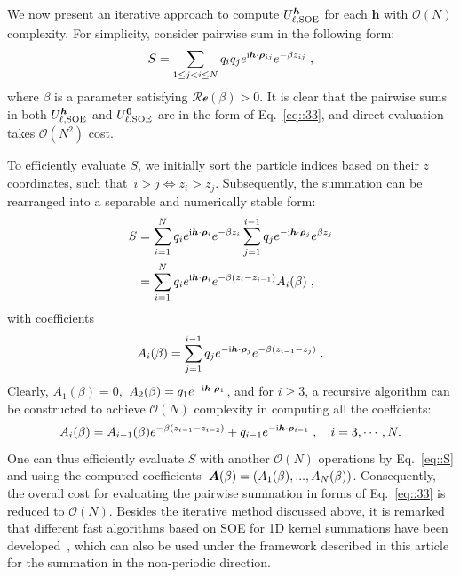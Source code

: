 We now present an iterative approach to compute $U_{\ell,\text{SOE}}^{\boldsymbol{h}}$ for each $\bm{h}$ with $\mathcal O(N)$ complexity. 
For simplicity, consider pairwise sum in the following form:
\begin{equation}\label{eq::33}
	S = \sum_{1\leq j < i \leq N} q_{i} q_{j} e^{\mathrm{i} \boldsymbol{h} \cdot \boldsymbol{\rho}_{ij}} e^{ - \beta z_{ij} }\;,
\end{equation}
where $\beta$ is a parameter satisfying $\mathscr{Re}(\beta)>0$. It is clear that the pairwise sums in both $U_{\ell,\text{SOE}}^{\boldsymbol{h}}$ and $U_{\ell,\text{SOE}}^{\boldsymbol{0}}$ are in the form of Eq.~\eqref{eq::33}, and direct evaluation takes $\mathcal O(N^2)$ cost. 

To efficiently evaluate $S$, we initially sort the particle indices based on their $z$ coordinates, such that~$i > j \iff z_i > z_j$.
Subsequently, the summation can be rearranged into a separable and numerically stable form:
\begin{align}
	S &=\sum_{i = 1}^N q_{i} e^{\mathrm{i} \bm{h}\cdot\bm{\rho}_{i}}e^{-\beta z_{i}} \sum_{j = 1}^{i - 1} q_{j} e^{-\mathrm{i} \bm{h}\cdot\bm{\rho}_{j}}e^{\beta z_{j}} \label{eq::S0} \\ 
	&= \sum_{i = 1}^N q_{i} e^{\mathrm{i} \bm{h}\cdot\bm{\rho}_{i}}e^{-\beta(z_{i} - z_{i - 1})}A_{i}(\beta)\;, \label{eq::S}
\end{align}
with coefficients
\begin{equation}
	A_{i}(\beta) =  \sum_{j = 1}^{i - 1} q_{j} e^{-\mathrm{i} \bm{h}\cdot\bm{\rho}_{j}}e^{-\beta(z_{i - 1} - z_{j})}\;.
\end{equation}
Clearly, $A_1(\beta)=0,$ $A_2(\beta)=q_1e^{-\mathrm{i} \bm{h}\cdot\bm{\rho}_1}$, and for $i\geq 3$, a recursive algorithm can be constructed to achieve $\mathcal O(N)$ complexity in computing all the coeffcients:
\begin{equation}\label{eq::35}
	A_{i}(\beta) = A_{i - 1}(\beta) e^{-\beta(z_{i - 1} - z_{i - 2})} + q_{i - 1}e^{-\mathrm{i} \bm{h}\cdot\bm{\rho}_{i-1}}\;,\quad i = 3, \cdots, N.
\end{equation}
One can thus efficiently evaluate $S$ with another $\mathcal{O}(N)$ operations by Eq.~\eqref{eq::S} and using the computed coefficients~$\boldsymbol{A}(\beta) = (A_1(\beta), ..., A_N(\beta))$. 
Consequently, the overall cost for evaluating the pairwise summation in forms of Eq.~\eqref{eq::33} is reduced to $\mathcal{O}(N)$.
Besides the iterative method discussed above, it is remarked that different fast algorithms based on SOE for 1D kernel summations have been developed~\cite{jiang2021approximating,GIMBUTAS2020815}, which can also be used under the framework described in this article for the summation in the non-periodic direction.

